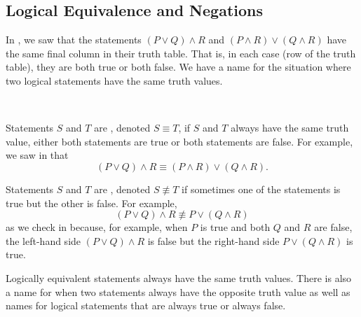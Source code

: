\newcommand{\subequivneg}{Logical Equivalence and Negations}
\subsection{\subequivneg}
\label{sub_logical_equivalence_negations}

In , we saw that the statements $(P \lor Q) \land R$ and $(P \land R) \lor (Q \land R)$ have the same final column in their truth table.  That is, in each case (row of the truth table), they are both true or both false.  We have a name for the situation where two logical statements have the same truth values.

\begin{defn}
\label{defn_logical_equiv}  
~
    \begin{apart}
        \item \label{part_equiv_distributive} Statements $S$ and $T$ are , denoted $S \equiv T$, if $S$ and $T$ always have the same truth value, either both statements are true or both statements are false.  For example, we saw in  that 
            $$(P \lor Q) \land R \equiv (P \land R) \lor (Q \land R).$$
        \item Statements $S$ and $T$ are , denoted $S \not \equiv T$ if sometimes one of the statements is true but the other is false.  For example,  
            $$(P \lor Q) \land R \not \equiv P \lor (Q \land R)$$
        as we check in  because, for example, when $P$ is true and both $Q$ and $R$ are false, the left-hand side $(P \lor Q) \land R$ is false but the right-hand side $P \lor (Q \land R)$ is true.
    \end{apart}   
\end{defn}

Logically equivalent statements always have the same truth values.  There is also a name for when two statements always have the opposite truth value as well as names for logical statements that are always true or always false.

